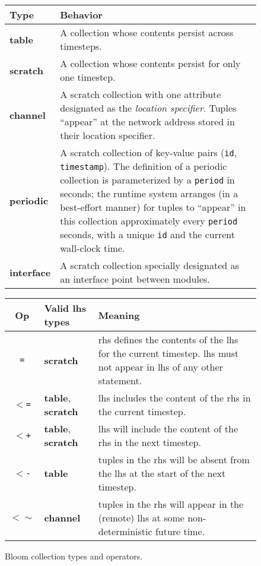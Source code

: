 \begin{figure}
	\begin{small}
	\begin{tabular}{|l|p{2.55in}|}
		\hline
		Type & Behavior\\
		\hline
		\textbf{table} & A collection whose contents persist across timesteps.\\
		\textbf{scratch} & A collection whose contents persist for only one timestep.\\
		\textbf{channel} & A scratch collection with one attribute designated as
        the {\em location specifier}. Tuples ``appear'' at the network address stored in their location specifier.\\
		\textbf{periodic} & A scratch collection of key-value pairs (\texttt{id}, \texttt{timestamp}).  The definition of a periodic collection is parameterized by a \texttt{period} in seconds; the runtime system arranges (in a best-effort manner) for tuples to ``appear'' in this collection approximately every \texttt{period} seconds, with a unique \texttt{id} and the current wall-clock time.\\
    \textbf{interface} & A scratch collection specially designated as an interface point between modules.\\
		\hline
	\end{tabular}

	\vspace{2em}
	\begin{tabular}{|c|l|p{2in}|}
		\hline
		Op & Valid lhs types & Meaning\\
				\hline 
		\texttt{=} & \textbf{scratch} & rhs defines the contents of the lhs for the current timestep.  lhs must not appear in lhs of any other statement.\\
		\texttt{$<$=} & \textbf{table}, \textbf{scratch} & lhs includes the content of the rhs in the current timestep.\\
		\texttt{$<$+} & \textbf{table}, \textbf{scratch} & lhs will include the content of the rhs in the next timestep.\\
		\texttt{$<$-} & \textbf{table} & tuples in the rhs will be absent from the lhs at the start of  the next timestep.\\
		\texttt{$<\sim$} & \textbf{channel} & tuples in the rhs will appear in the (remote) lhs at some non-deterministic future time.\\
		\hline
	\end{tabular}
	\end{small}
	\caption{Bloom collection types and operators.}
	\label{tab:bloom}
\end{figure}


